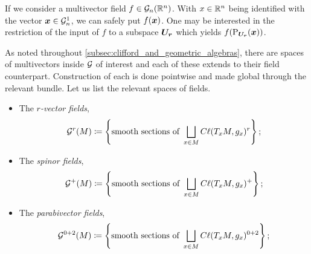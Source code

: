 \begin{remark}
\label{rem:input_projection}
    If we consider a multivector field $f \in \mathcal{G}_n(\mathbb{R}^n)$. With $x\in \mathbb{R}^n$ being identified with the vector $\boldsymbol{x} \in \mathcal{G}_n^1$, we can safely put $f(\boldsymbol{x})$.  One may be interested in the restriction of the input of $f$ to a subspace $\boldsymbol{U_r}$ which yields $f(\operatorname{P}_{\boldsymbol{U_r}}(\boldsymbol{x}))$.  
\end{remark}

As noted throughout \cref{subsec:clifford_and_geometric_algebras}, there are spaces of multivectors inside $\mathcal{G}$ of interest and each of these extends to their field counterpart. Construction of each is done pointwise and made global through the relevant bundle. Let us list the relevant spaces of fields.
\begin{itemize}
    \item The \emph{$r$-vector fields},
    \begin{equation}
        \mathcal{G}^r(M) \coloneqq \left\{\textrm{smooth sections of } \bigsqcup_{x \in M} C\ell(T_xM,g_x)^r\right\}; 
    \end{equation}
    \item The \emph{spinor fields},
    \begin{equation}
        \mathcal{G}^+(M) \coloneqq \left\{\textrm{smooth sections of } \bigsqcup_{x \in M} C\ell(T_xM,g_x)^+\right\};
    \end{equation}
    \item The \emph{parabivector fields},
    \begin{equation}
        \mathcal{G}^{0+2}(M) \coloneqq \left\{\textrm{smooth sections of } \bigsqcup_{x \in M}  C\ell(T_xM,g_x)^{0+2}\right\};
    \end{equation}
\end{itemize}
